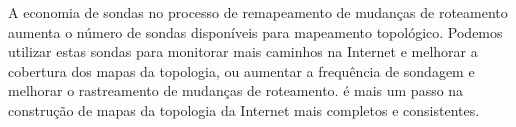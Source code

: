 A economia de sondas no processo de remapeamento de mudanças de
roteamento aumenta o número de sondas disponíveis para mapeamento
topológico.  Podemos utilizar estas sondas para monitorar mais caminhos
na Internet e melhorar a cobertura dos mapas da topologia, ou aumentar a
frequência de sondagem e melhorar o rastreamento de mudanças de
roteamento.  \rmprt{} é mais um passo na construção de mapas da
topologia da Internet mais completos e consistentes.







